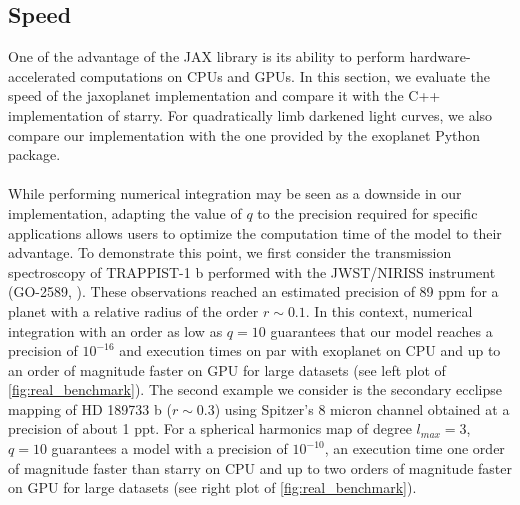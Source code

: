 \documentclass[modern]{aastex631}
\begin{document}
\subsection{Speed}\label{speed}

One of the advantage of the \textsf{JAX} library is its ability to perform hardware-accelerated computations on CPUs and GPUs. In this section, we evaluate the speed of the \textsf{jaxoplanet} implementation and compare it with the C++ implementation of \textsf{starry}. For quadratically limb darkened light curves, we also compare our implementation with the one provided by the \textsf{exoplanet} Python package.\\\\
While performing numerical integration may be seen as a downside in our implementation, adapting the value of $q$ to the precision required for specific applications allows users to optimize the computation time of the model to their advantage. To demonstrate this point, we first consider the transmission spectroscopy of TRAPPIST-1 b performed with the JWST/NIRISS instrument (GO-2589, \citealt{Lim2023}). These observations reached an estimated precision of 89 ppm for a planet with a relative radius of the order $r\sim0.1$. In this context, numerical integration with an order as low as $q=10$ guarantees that our model reaches a precision of $10^{-16}$ and execution times on par with \textsf{exoplanet} on CPU and up to an order of magnitude faster on GPU for large datasets (see left plot of \autoref{fig:real_benchmark}). The second example we consider is the secondary ecclipse mapping of HD 189733 b ($r\sim0.3$) using Spitzer's 8 micron channel \citep{majeau2012} obtained at a precision of about 1 ppt. For a spherical harmonics map of degree $l_{max}=3$, $q=10$ guarantees a model with a precision of $10^{-10}$, an execution time one order of magnitude faster than \textsf{starry} on CPU and up to two orders of magnitude faster on GPU for large datasets (see right plot of \autoref{fig:real_benchmark}).\\\\
\end{document}
